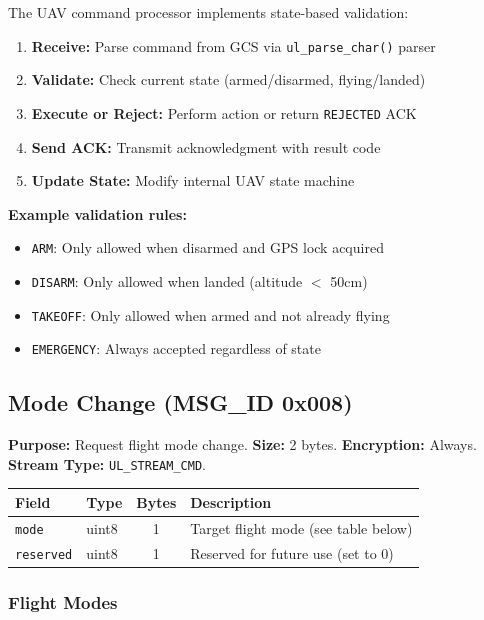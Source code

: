 \documentclass[11pt,a4paper]{article}
\begin{document}
The UAV command processor implements state-based validation:

\begin{enumerate}[noitemsep]
    \item \textbf{Receive:} Parse command from GCS via \texttt{ul\_parse\_char()} parser
    \item \textbf{Validate:} Check current state (armed/disarmed, flying/landed)
    \item \textbf{Execute or Reject:} Perform action or return \texttt{REJECTED} ACK
    \item \textbf{Send ACK:} Transmit acknowledgment with result code
    \item \textbf{Update State:} Modify internal UAV state machine
\end{enumerate}

\textbf{Example validation rules:}
\begin{itemize}[noitemsep]
    \item \texttt{ARM}: Only allowed when disarmed and GPS lock acquired
    \item \texttt{DISARM}: Only allowed when landed (altitude $<$ 50cm)
    \item \texttt{TAKEOFF}: Only allowed when armed and not already flying
    \item \texttt{EMERGENCY}: Always accepted regardless of state
\end{itemize}

\subsection{Mode Change (MSG\_ID 0x008)}

\textbf{Purpose:} Request flight mode change. \textbf{Size:} 2 bytes. \textbf{Encryption:} Always. \textbf{Stream Type:} \texttt{UL\_STREAM\_CMD}.

\begin{table}[H]
\centering
\begin{tabular}{@{}llcl@{}}
\toprule
\textbf{Field} & \textbf{Type} & \textbf{Bytes} & \textbf{Description} \\
\midrule
\texttt{mode}     & uint8 & 1 & Target flight mode (see table below) \\
\texttt{reserved} & uint8 & 1 & Reserved for future use (set to 0) \\
\bottomrule
\end{tabular}
\end{table}

\subsubsection{Flight Modes}
\end{document}
